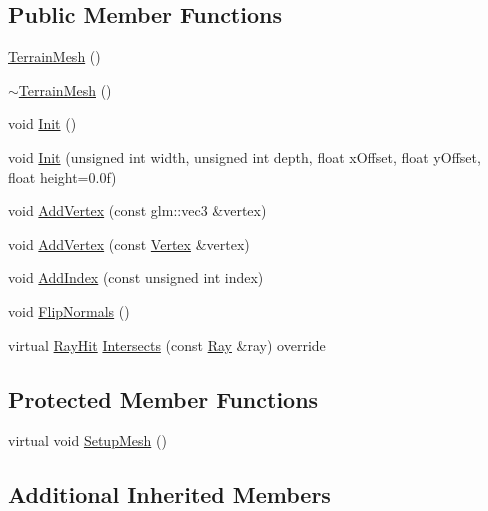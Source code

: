 \subsection*{Public Member Functions}
\begin{DoxyCompactItemize}
\item 
\mbox{\hyperlink{classngl_1_1_terrain_mesh_ae2f5614f9eb2e2814b2c3cd382ffea75}{Terrain\+Mesh}} ()
\item 
\mbox{\hyperlink{classngl_1_1_terrain_mesh_a5ec5826f5900678f960f08607c9d9c97}{$\sim$\+Terrain\+Mesh}} ()
\item 
void \mbox{\hyperlink{classngl_1_1_terrain_mesh_adcbd87afe29c47b1d1edf5e893dfb95d}{Init}} ()
\item 
void \mbox{\hyperlink{classngl_1_1_terrain_mesh_a23945d3a6905069b02b95684ef965447}{Init}} (unsigned int width, unsigned int depth, float x\+Offset, float y\+Offset, float height=0.\+0f)
\item 
void \mbox{\hyperlink{classngl_1_1_terrain_mesh_a8b9883d7d25727fc6ab0b2ecc7ec7848}{Add\+Vertex}} (const glm\+::vec3 \&vertex)
\item 
void \mbox{\hyperlink{classngl_1_1_terrain_mesh_a62a2491c6d088268e87fc8d7fa0e2528}{Add\+Vertex}} (const \mbox{\hyperlink{structngl_1_1_vertex}{Vertex}} \&vertex)
\item 
void \mbox{\hyperlink{classngl_1_1_terrain_mesh_a16c7081209ef67763ff85de630c17b59}{Add\+Index}} (const unsigned int index)
\item 
void \mbox{\hyperlink{classngl_1_1_terrain_mesh_ada9c72a7f96566d634af9e3e20eb0376}{Flip\+Normals}} ()
\item 
virtual \mbox{\hyperlink{classngl_1_1_ray_hit}{Ray\+Hit}} \mbox{\hyperlink{classngl_1_1_terrain_mesh_ace57d898dc60e94330ef4f46e54abe2e}{Intersects}} (const \mbox{\hyperlink{classngl_1_1_ray}{Ray}} \&ray) override
\end{DoxyCompactItemize}
\subsection*{Protected Member Functions}
\begin{DoxyCompactItemize}
\item 
virtual void \mbox{\hyperlink{classngl_1_1_terrain_mesh_aa473949dcd4dca706fbb04363ef075ed}{Setup\+Mesh}} ()
\end{DoxyCompactItemize}
\subsection*{Additional Inherited Members}


